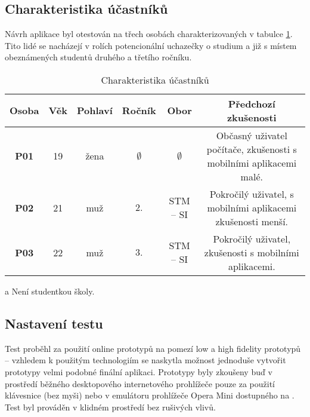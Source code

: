 \subsection{Charakteristika účastníků}
Návrh aplikace byl otestován na třech osobách charakterizovaných v tabulce \ref{tab:charakteristikaUcastniku}. Tito lidé se nacházejí v rolích potencionální uchazečky o studium a již s místem obeznámených studentů druhého a třetího ročníku.
\begin{table}
\begin{center}
\begin{threeparttable}
\begin{tabular}{|c|c|c|c|c|c|}
\hline
\textbf{Osoba} & \textbf{Věk} & \textbf{Pohlaví} & \textbf{Ročník} & \textbf{Obor} & \textbf{Předchozí zkušenosti} \\
\hline
\textbf{P01} & 19 & žena & $\emptyset$\tnote{a} & $\emptyset$\tnote{a} & \parbox{2.5in}{\vspace{3pt} Občasný uživatel počítače, zkušenosti s mobilními aplikacemi malé.\vspace{3pt}} \\
\textbf{P02} & 21 & muž & $2.$ & STM -- SI & \parbox{2.5in}{\vspace{3pt} Pokročilý uživatel, s mobilními aplikacemi zkušenosti menší.\vspace{3pt}} \\
\textbf{P03} & 22 & muž & $3.$ & STM -- SI & \parbox{2.5in}{\vspace{3pt} Pokročilý uživatel, zkušenosti s mobilními aplikacemi.\vspace{3pt}} \\
\hline
\end{tabular}
\begin{tablenotes}
\item [a] Není studentkou školy.
\end{tablenotes}
\caption{Charakteristika účastníků}
\label{tab:charakteristikaUcastniku}
\end{threeparttable}
\end{center}
\end{table}

\subsection{Nastavení testu}
Test proběhl za použití online prototypů na pomezí low a high fidelity prototypů -- vzhledem k použitým technologiím se naskytla možnost jednoduše vytvořit prototypy velmi podobné finální aplikaci. Prototypy byly zkoušeny buď v prostředí běžného desktopového internetového prohlížeče pouze za použití klávesnice (bez myši) nebo v emulátoru prohlížeče Opera Mini dostupného na \cite{OperaMiniDemo}. Test byl prováděn v klidném prostředí bez rušivých vlivů.

